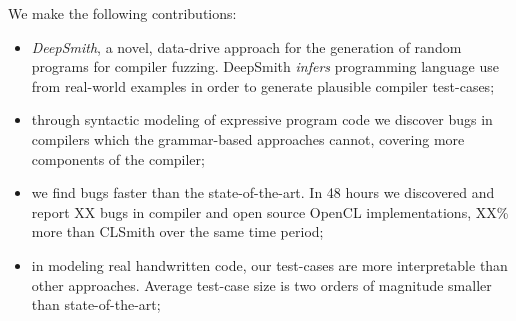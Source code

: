 %
%
%
%

We make the following contributions:
%
\begin{itemize}
\item \emph{DeepSmith}, a novel, data-drive approach for the generation of random programs for compiler fuzzing. DeepSmith \emph{infers} programming language use from real-world examples in order to generate plausible compiler test-cases; %
\item through syntactic modeling of expressive program code we discover bugs in compilers which the grammar-based approaches cannot, covering more components of the compiler;
\item we find bugs faster than the state-of-the-art. In 48 hours we discovered and report XX bugs in compiler and open source OpenCL implementations, XX\% more than CLSmith over the same time period;
\item in modeling real handwritten code, our test-cases are more interpretable than other approaches. Average test-case size is two orders of magnitude smaller than state-of-the-art;
\end{itemize}
